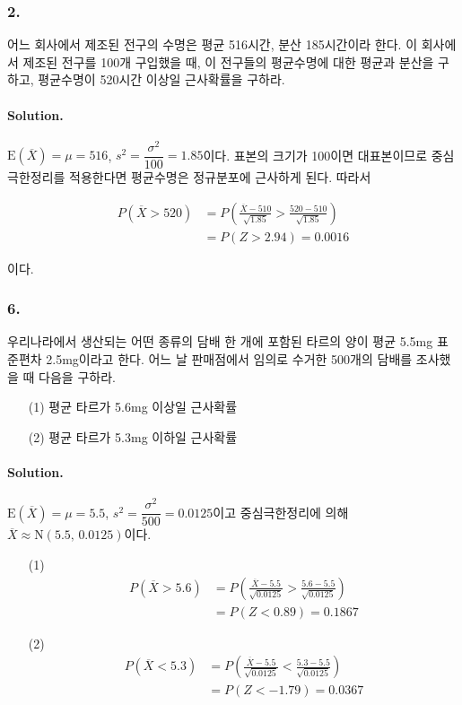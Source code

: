 \subsubsection{2.} 어느 회사에서 제조된 전구의 수명은 평균 516시간, 분산 185시간이라 한다.
이 회사에서 제조된 전구를 100개 구입했을 때, 이 전구들의 평균수명에 대한 평균과 분산을 구하고, 평균수명이 520시간 이상일 근사확률을 구하라.

\paragraph{Solution.} $\mathrm{E}\left(\overline{X}\right)=\mu=516$, $s^2=\dfrac{\sigma^2}{100}=1.85$이다.
표본의 크기가 100이면 대표본이므로 중심극한정리를 적용한다면 평균수명은 정규분포에 근사하게 된다. 따라서

\begin{align*}
    P\left(\overline{X}>520\right) &= P\left(\frac{\overline{X}-510}{\sqrt{1.85}}>\frac{520-510}{\sqrt{1.85}}\right) \\
    &= P\left(Z>2.94\right) = 0.0016
\end{align*}

이다.

\subsubsection{6.} 우리나라에서 생산되는 어떤 종류의 담배 한 개에 포함된 타르의 양이 평균 5.5mg 표준편차 2.5mg이라고 한다.
어느 날 판매점에서 임의로 수거한 500개의 담배를 조사했을 때 다음을 구하라.

\begin{itemize}
    \item[(1)] 평균 타르가 5.6mg 이상일 근사확률
    \item[(2)] 평균 타르가 5.3mg 이하일 근사확률 
\end{itemize}

\paragraph{Solution.} $\mathrm{E}\left(\overline{X}\right)=\mu=5.5$, $s^2=\dfrac{\sigma^2}{500}=0.0125$이고
중심극한정리에 의해 $\overline{X} \approx \mathrm{N}\left(5.5,\,0.0125\right)$이다.

\begin{itemize}
    \item[(1)] {
        \begin{align*}
            P\left(\overline{X}>5.6\right) &= P\left(\frac{\overline{X}-5.5}{\sqrt{0.0125}}>\frac{5.6-5.5}{\sqrt{0.0125}}\right) \\
            &= P\left(Z<0.89\right) = 0.1867
        \end{align*}
    }
    \item[(2)] {
        \begin{align*}
            P\left(\overline{X}<5.3\right) &= P\left(\frac{\overline{X}-5.5}{\sqrt{0.0125}}<\frac{5.3-5.5}{\sqrt{0.0125}}\right) \\
            &= P\left(Z<-1.79\right) = 0.0367
        \end{align*}
    }
\end{itemize}

